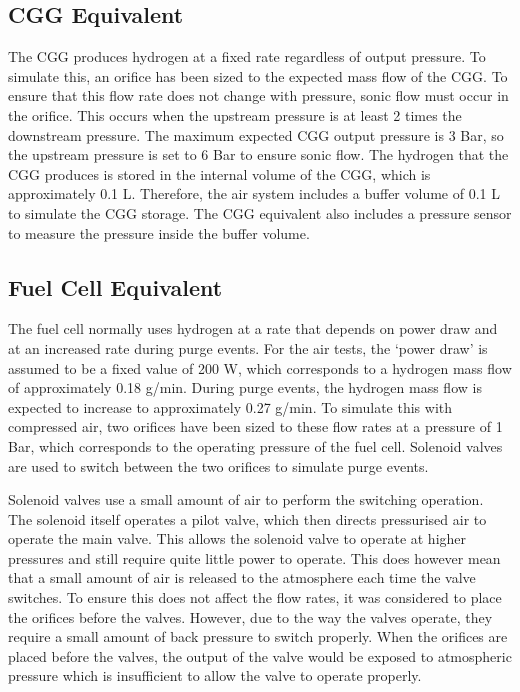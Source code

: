 \subsection*{CGG Equivalent}
The CGG produces hydrogen at a fixed rate regardless of output pressure. To simulate this, an orifice has been sized to the expected mass flow of the CGG. To ensure that this flow rate does not change with pressure, sonic flow must occur in the orifice. This occurs when the upstream pressure is at least 2 times the downstream pressure. The maximum expected CGG output pressure is 3 Bar, so the upstream pressure is set to 6 Bar to ensure sonic flow. The hydrogen that the CGG produces is stored in the internal volume of the CGG, which is approximately 0.1 L. Therefore, the air system includes a buffer volume of 0.1 L to simulate the CGG storage. The CGG equivalent also includes a pressure sensor to measure the pressure inside the buffer volume.

\subsection*{Fuel Cell Equivalent}
The fuel cell normally uses hydrogen at a rate that depends on power draw and at an increased rate during purge events. For the air tests, the `power draw' is assumed to be a fixed value of 200 W, which corresponds to a hydrogen mass flow of approximately 0.18 g/min. During purge events, the hydrogen mass flow is expected to increase to approximately 0.27 g/min. To simulate this with compressed air, two orifices have been sized to these flow rates at a pressure of 1 Bar, which corresponds to the operating pressure of the fuel cell. Solenoid valves are used to switch between the two orifices to simulate purge events.

Solenoid valves use a small amount of air to perform the switching operation. The solenoid itself operates a pilot valve, which then directs pressurised air to operate the main valve. This allows the solenoid valve to operate at higher pressures and still require quite little power to operate. This does however mean that a small amount of air is released to the atmosphere each time the valve switches. To ensure this does not affect the flow rates, it was considered to place the orifices before the valves. However, due to the way the valves operate, they require a small amount of back pressure to switch properly. When the orifices are placed before the valves, the output of the valve would be exposed to atmospheric pressure which is insufficient to allow the valve to operate properly.

